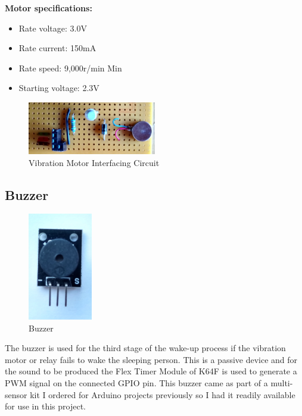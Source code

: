\documentclass[12pt,a4paper]{article}
\begin{document}
		{\bfseries Motor specifications:}
		\begin{itemize}
			\item Rate voltage: 3.0V
			\item Rate current: 150mA
			\item Rate speed: 9,000r/min Min
			\item Starting voltage: 2.3V
		\end{itemize}
		
        \begin{figure}[h]
         \centering
         \includegraphics[width=0.5\textwidth]{circuit1.jpg}
         \caption{Vibration Motor Interfacing Circuit}
         \label{fig:vibMotIC}
        \end{figure}
        \newpage
		
		\subsection{Buzzer}
        \begin{figure}
         \centering
         \includegraphics[width=0.25\textwidth]{buzzer1.jpg}
         \caption{Buzzer}
        \end{figure}
		The buzzer is used for the third stage of the wake-up process if the vibration motor or 
		relay fails to wake the sleeping person. This is a passive device and for the sound to be produced the Flex Timer Module of K64F is used to generate a PWM signal on the connected GPIO pin. This buzzer came as part of a multi-sensor kit I ordered for Arduino projects previously so I had it readily available for use in this project.\\\\
		
\end{document}
